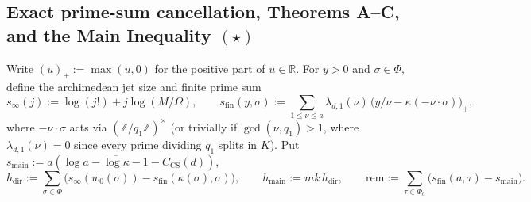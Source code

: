 \documentclass[11pt]{amsart}
\newcommand{\RR}{\mathbb{R}}
\newcommand{\ZZ}{\mathbb{Z}}
\newcommand{\sfin}{s_{\mathrm{fin}}}
\newcommand{\sinf}{s_{\infty}}
\newcommand{\smain}{s_{\mathrm{main}}}
\newcommand{\hmain}{h_{\mathrm{main}}}
\newcommand{\hdir}{h_{\mathrm{dir}}}
\newcommand{\rem}{\mathrm{rem}}
\theoremstyle{definition}
\theoremstyle{remark}
\begin{document}
\subsection{Exact prime-sum cancellation, Theorems A--C, and the Main Inequality \texorpdfstring{$(\star)$}{(*)}}
Write $(u)_+:=\max(u,0)$ for the positive part of $u\in\RR$. For $y>0$ and $\sigma\in\Phi$, define the archimedean jet size and finite prime sum
\begin{equation}\label{eq:jets_primes}
 \sinf(j):=\log(j!)+j\log(M/\Omega),\qquad
 \sfin(y,\sigma):=\sum_{1\le\nu\le a}\lambda_{d,1}(\nu)\,\bigl(y/\nu-\kappa(-\nu\cdot\sigma)\bigr)_+,
\end{equation}
where $-\nu\cdot\sigma$ acts via $(\ZZ/q_1\ZZ)^\times$ (or trivially if $\gcd(\nu,q_1)>1$, where $\lambda_{d,1}(\nu)=0$ since every prime dividing $q_1$ splits in $K$). Put $\smain:=a(\log a-\overline{\log\kappa}-1-C_{\mathrm{CS}}(d))$,
\[
 \hdir:=\sum_{\sigma\in\Phi}\bigl(\sinf(w_0(\sigma))-\sfin(\kappa(\sigma),\sigma)\bigr),\qquad
 \hmain:=mk\,\hdir,\qquad
 \rem:=\sum_{\tau\in\Phi_a}\bigl(\sfin(a,\tau)-\smain\bigr).
\]
\end{document}
